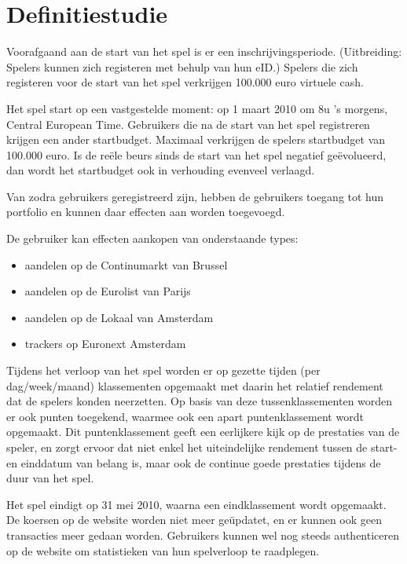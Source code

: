 \chapter{Definitiestudie}

Voorafgaand aan de start van het spel is er een inschrijvingsperiode. (Uitbreiding: Spelers kunnen zich registeren met behulp van hun eID.) Spelers die zich registeren voor de start van het spel verkrijgen 100.000 euro virtuele cash.

Het spel start op een vastgestelde moment: op 1 maart 2010 om 8u 's morgens, Central European Time. Gebruikers die na de start van het spel registreren krijgen een ander startbudget. Maximaal verkrijgen de spelers startbudget van 100.000 euro. Is de reële beurs sinds de start van het spel negatief geëvolueerd, dan wordt het startbudget ook in verhouding evenveel verlaagd.

Van zodra gebruikers geregistreerd zijn, hebben de gebruikers toegang tot hun portfolio en kunnen daar effecten aan worden toegevoegd.

De gebruiker kan effecten aankopen van onderstaande types:
\begin{itemize}
  \setlength{\itemsep}{1pt}
  \setlength{\parskip}{0pt}
  \setlength{\parsep}{0pt}
	\item{aandelen op de Continumarkt van Brussel}
	\item{aandelen op de Eurolist van Parijs}
	\item{aandelen op de Lokaal van Amsterdam}
	\item{trackers op Euronext Amsterdam}
\end{itemize}

Tijdens het verloop van het spel worden er op gezette tijden (per dag/week/maand) klassementen opgemaakt met daarin het relatief rendement dat de spelers konden neerzetten. Op basis van deze tussenklassementen worden er ook punten toegekend, waarmee ook een apart puntenklassement wordt opgemaakt. Dit puntenklassement geeft een eerlijkere kijk op de prestaties van de speler, en zorgt ervoor dat niet enkel het uiteindelijke rendement tussen de start- en einddatum van belang is, maar ook de continue goede prestaties tijdens de duur van het spel.

Het spel eindigt op 31 mei 2010, waarna een eindklassement wordt opgemaakt. De koersen op de website worden niet meer geüpdatet, en er kunnen ook geen transacties meer gedaan worden. Gebruikers kunnen wel nog steeds authenticeren op de website om statistieken van hun spelverloop te raadplegen.

